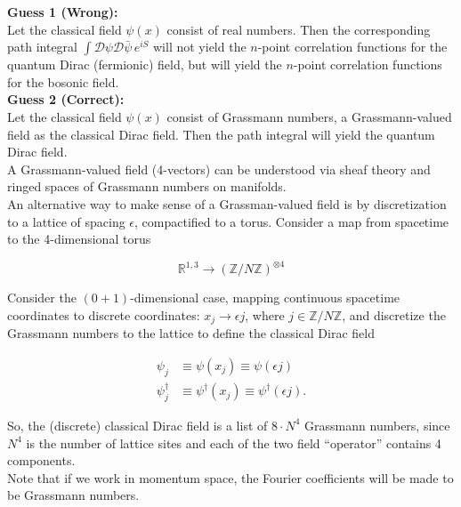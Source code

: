 \noindent \textbf{Guess 1 (Wrong):} \\

\noindent Let the classical field $\psi (x)$ consist of real numbers. Then the corresponding path integral $\int \mathcal{D} \psi \mathcal{D} \bar{\psi} \, e^{iS}$ will not yield the $n$-point correlation functions for the quantum Dirac (fermionic) field, but will yield the $n$-point correlation functions for the bosonic field. \\

\noindent \textbf{Guess 2 (Correct):} \\

\noindent Let the classical field $\psi (x)$ consist of Grassmann numbers, a Grassmann-valued field as the classical Dirac field. Then the path integral will yield the quantum Dirac field. \\

\noindent A Grassmann-valued field (4-vectors) can be understood via sheaf theory and ringed spaces of Grassmann numbers on manifolds. \\

\noindent An alternative way to make sense of a Grassman-valued field is by discretization to a lattice of spacing $\epsilon$, compactified to a torus. Consider a map from spacetime to the 4-dimensional torus

\begin{equation}
\mathbb{R}^{1,3} \rightarrow (\mathbb{Z} / N \mathbb{Z})^{\otimes 4}
\end{equation}

\noindent Consider the $(0+1)$-dimensional case, mapping continuous spacetime coordinates to discrete coordinates: $x_j \rightarrow \epsilon j$, where $j \in \mathbb{Z}/N\mathbb{Z}$, and discretize the Grassmann numbers to the lattice to define the classical Dirac field

\begin{align}
\psi_j &\equiv \psi (x_j) \equiv \psi (\epsilon j) \\
\psi_j^\dagger &\equiv \psi^\dagger (x_j) \equiv  \psi^\dagger (\epsilon j).
\end{align}

\noindent So, the (discrete) classical Dirac field is a list of $8 \cdot N^4$ Grassmann numbers, since $N^4$ is the number of lattice sites and each of the two field ``operator'' contains 4 components. \\

\noindent Note that if we work in momentum space, the Fourier coefficients will be made to be Grassmann numbers. \\

